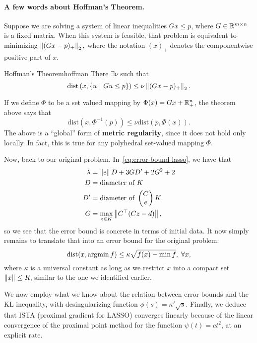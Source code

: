 \paragraph{A few words about Hoffman's Theorem.} Suppose we are solving a
system of linear inequalities $Gx \leq p$, where $G \in \mathbb{R}^{m \times n}$ is a
fixed matrix. When this system is feasible, that problem is equivalent to
minimizing
\(
	\left \| (Gx - p)_+ \right \|_2,
\)
where the notation $(x)_+$ denotes the componentwise positive part of $x$.
\begin{ctheorem}{Hoffman's Theorem}{hoffman}
	There $\exists \nu$ such that
	\[
		\mathrm{dist}\left(x, \left\{ u \ \middle| \  Gu \leq p \right\}\right)
		\leq \nu \left \| (Gx - p)_+ \right \|_2.
	\]
\end{ctheorem}
If we define $\Phi$ to be a set valued mapping by $\Phi(x) = Gx + \mathbb{R}_+^n$,
the theorem above says that
\[
	\mathrm{dist}\left(x, \Phi^{-1}(p)\right) \leq \nu \mathrm{dist}(p,
	\Phi(x)).
\]
The above is a ``global'' form of \textbf{metric regularity}, since it does not
hold only locally. In fact, this is true for any polyhedral set-valued mapping
$\Phi$.

Now, back to our original problem. In~\cref{eq:error-bound-lasso}, we have that
\begin{align*}
	\lambda &= \left \| e \right \| D + 3 G D' + 2 G^2 + 2 \\
	D &= \text{diameter of } K \\
	D' &= \text{diameter of } \begin{pmatrix} C \\ e \end{pmatrix} K \\
	G &= \max_{z \in K} \left \| C^\top (Cz - d) \right \|,
\end{align*}
so we see that the error bound is concrete in terms of initial data. It now
simply remains to translate that into an error bound for the original problem:
\[
	\mathrm{dist}(x, \operatorname*{argmin} f) \leq
	\kappa \sqrt{f(x) - \min f}, \; \forall x,
\]
where $\kappa$ is a universal constant as long as we restrict $x$ into a
compact set $\left \| x \right \| \leq R$, similar to the one we identified earlier.

We now employ what we know about the relation between error bounds and the KL
inequality, with desingularizing function $\phi(s) = \kappa' \sqrt{s}$.
Finally, we deduce that ISTA (proximal gradient for LASSO) converges linearly
because of the linear convergence of the proximal point method for the function
$\psi(t) = c t^2$, at an explicit rate.

